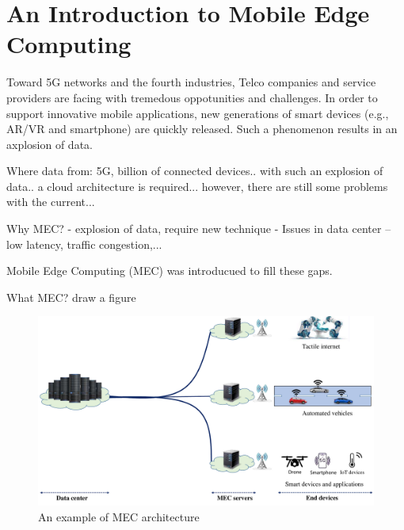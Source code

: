 \section{An Introduction to Mobile Edge Computing}  \label{intro}


Toward 5G networks and the fourth industries, Telco companies and service providers are facing with tremedous oppotunities and challenges. In order to support innovative mobile applications, new generations of smart devices (e.g., AR/VR and smartphone) are quickly released. Such a phenomenon results in an axplosion of data. 


Where data from: 5G, billion of connected devices.. with  such an explosion of data.. a cloud architecture is required... however, there are still some problems with the current...


Why MEC? 
  - explosion of data, require new technique
  - Issues in data center -- low latency, traffic congestion,...

Mobile Edge Computing (MEC) was introducued to fill these gaps.

What MEC? draw a figure


\begin{figure}[H]
  \begin{center}
   \includegraphics[width=13cm]{./figures/mec-arch.pdf}
   \caption{An example of MEC architecture}
   \label{fig:mec-arch}
   \end{center}
\end{figure}
